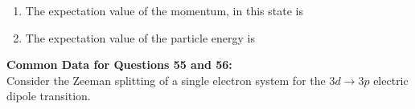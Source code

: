 \documentclass[14pt, a4paper]{extarticle}
\begin{document}
\begin{enumerate}[label=\textbf{Q. \arabic*}, start=53]

\item The expectation value of the momentum, in this state is
\begin{enumerate}[label=(\Alph*)]
\end{enumerate}

\item The expectation value of the particle energy is
\begin{enumerate}[label=(\Alph*)]
\end{enumerate}

\end{enumerate}

\vspace{1.5em}
\noindent
\textbf{Common Data for Questions 55 and 56:} \\
Consider the Zeeman splitting of a single electron system for the $3d \rightarrow 3p$ electric dipole transition.
\end{document}
